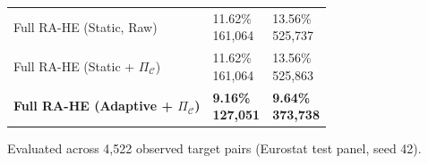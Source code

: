 \begin{table}[!htbp]
\begin{tabular}{>{\raggedright\arraybackslash}p{3.2cm}>{\centering\arraybackslash}p{2.3cm}>{\centering\arraybackslash}p{2.3cm}}
Full RA-HE (Static, Raw) & \shortstack{11.62\%\\{\scriptsize 161,064}} & \shortstack{13.56\%\\{\scriptsize 525,737}} \\
Full RA-HE (Static + $\Pi_{\mathcal{C}}$) & \shortstack{11.62\%\\{\scriptsize 161,064}} & \shortstack{13.56\%\\{\scriptsize 525,863}} \\
\textbf{Full RA-HE (Adaptive + $\Pi_{\mathcal{C}}$)} & \shortstack{\textbf{9.16\%}\\{\scriptsize \textbf{127,051}}} & \shortstack{\textbf{9.64\%}\\{\scriptsize \textbf{373,738}}} \\
\bottomrule
\end{tabular}
\par\vspace{2pt}
\scriptsize\raggedright 
Evaluated across 4,522 observed target pairs (Eurostat test panel, seed 42).
\end{table}
